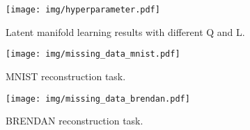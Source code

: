 \newpage
\begin{figure}[t!]
    \vspace{-.1in}
    \centering
     \caption{Latent manifold learning results with  different Q and L.}
    \texttt{[image: img/hyperparameter.pdf]} 
   
    \label{fig:hyperparameter}
\end{figure}
\newpage

\begin{figure}[t!]
    \vspace{-.1in}
    \centering
    \texttt{[image: img/missing\_data\_mnist.pdf]}
    \caption{MNIST reconstruction task.}
    \vspace{-0.2in}
    \label{fig:missing_data_mnist}
    
    \vspace{1.0in} %
    \texttt{[image: img/missing\_data\_brendan.pdf]}
    \caption{BRENDAN reconstruction task.}
    \vspace{-0.2in}
    \label{fig:missing_data_brendan}
\end{figure}


